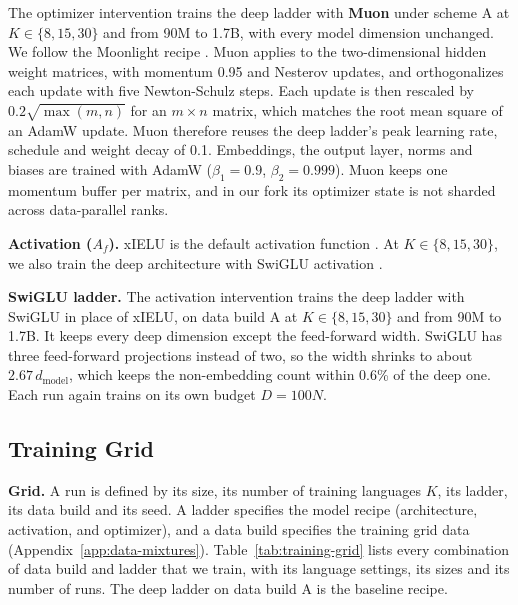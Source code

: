 The optimizer intervention trains the deep ladder with \textbf{Muon} \citep{jordan_muon_2024} under scheme A at $K \in \{8, 15, 30\}$ and from 90M to 1.7B, with every model dimension unchanged. We follow the Moonlight recipe \citep{liu_muon_2025}. Muon applies to the two-dimensional hidden weight matrices, with momentum 0.95 and Nesterov updates, and orthogonalizes each update with five Newton-Schulz steps. Each update is then rescaled by $0.2\sqrt{\max(m, n)}$ for an $m \times n$ matrix, which matches the root mean square of an AdamW update. Muon therefore reuses the deep ladder's peak learning rate, schedule and weight decay of 0.1. Embeddings, the output layer, norms and biases are trained with AdamW ($\beta_1 = 0.9$, $\beta_2 = 0.999$). Muon keeps one momentum buffer per matrix, and in our fork its optimizer state is not sharded across data-parallel ranks.

\textbf{Activation ($A_f$).}
xIELU is the default activation function \citep{huang_xielu_2025}.
At $K \in \{8, 15, 30\}$, we also train the deep architecture with SwiGLU activation \citeneeded{}. %

\textbf{SwiGLU ladder.} The activation intervention trains the deep ladder with SwiGLU in place of xIELU, on data build A at $K \in \{8, 15, 30\}$ and from 90M to 1.7B. It keeps every deep dimension except the feed-forward width. SwiGLU has three feed-forward projections instead of two, so the width shrinks to about $2.67\,d_{\mathrm{model}}$, which keeps the non-embedding count within 0.6\% of the deep one. Each run again trains on its own budget $D = 100N$.

\subsection{Training Grid}
\label{app:training-grid}

\textbf{Grid.} A run is defined by its size, its number of training languages $K$, its ladder, its data build and its seed. A ladder specifies the model recipe (architecture, activation, and optimizer), and a data build specifies the training grid data (Appendix~\ref{app:data-mixtures}). Table~\ref{tab:training-grid} lists every combination of data build and ladder that we train, with its language settings, its sizes and its number of runs. The deep ladder on data build A is the baseline recipe.


